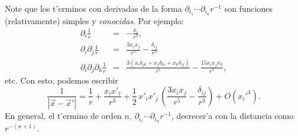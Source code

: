 Note que los t'erminos con derivadas de la forma $\partial_{i_1}\cdots
\partial_{i_n}r^{-1}$ son funciones (relativamente) simples y \textit{conocidas}.
Por ejemplo:
\begin{eqnarray}
\partial_i\frac{1}{r}&=&-\frac{x_i}{r^3}, \\
\partial_i\partial_j\frac{1}{r}
&=& \frac{3x_ix_j}{r^5}-\frac{\delta_{ij}}{r^3} \\
\partial_i\partial_j\partial_k\frac{1}{r}
&=& \frac{3\left(x_i\delta_{jk}+x_j\delta_{ki}+x_k\delta_{ij}\right)}{r^5}
-\frac{15x_ix_jx_k}{r^7},
\end{eqnarray}
etc. Con esto, podemos escribir
\begin{equation} \label{eq3.2.3}
\frac{1}{|\vec{x}-\vec{x}'|}=\frac{1}{r}+\frac{x_ix'_i}{r^3}
+\frac{1}{2}\,x'_ix'_j\,\left(\frac{3x_ix_j}{r^5}-\frac{\delta_{ij}}{
r^3}\right)+O\left(x_i'^3\right).
\end{equation}
En general, el t'ermino de orden $n$, $\partial_{i_1}\cdots
\partial_{i_n}r^{-1}$, decrecer'a con la distancia como $r^{-(n+1)}$.

